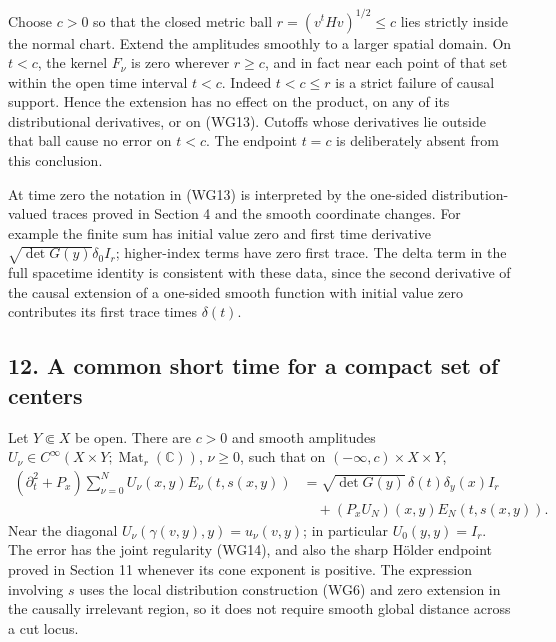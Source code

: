 \documentclass[
  11pt,
]{article}
\begin{document}
Choose \(c>0\) so that the closed metric ball \(r=(v^tHv)^{1/2}\leq c\)
lies strictly inside the normal chart. Extend the amplitudes smoothly to
a larger spatial domain. On \(t<c\), the kernel \(F_\nu\) is zero
wherever \(r\geq c\), and in fact near each point of that set within the
open time interval \(t<c\). Indeed \(t< c\leq r\) is a strict failure of
causal support. Hence the extension has no effect on the product, on any
of its distributional derivatives, or on (WG13). Cutoffs whose
derivatives lie outside that ball cause no error on \(t<c\). The
endpoint \(t=c\) is deliberately absent from this conclusion.

At time zero the notation in (WG13) is interpreted by the one-sided
distribution-valued traces proved in Section 4 and the smooth coordinate
changes. For example the finite sum has initial value zero and first
time derivative \(\sqrt{\det G(y)}\delta_0I_r\); higher-index terms have
zero first trace. The delta term in the full spacetime identity is
consistent with these data, since the second derivative of the causal
extension of a one-sided smooth function with initial value zero
contributes its first trace times \(\delta(t)\).

\subsection{12. A common short time for a compact set of
centers}\label{a-common-short-time-for-a-compact-set-of-centers}

Let \(Y\Subset X\) be open. There are \(c>0\) and smooth amplitudes
\(U_\nu\in C^\infty(X\times Y;\operatorname{Mat}_r(\mathbb C))\),
\(\nu\geq0\), such that on \((-\infty,c)\times X\times Y\), \[
\begin{split}
 (\partial_t^2+P_x)\sum_{\nu=0}^N
           U_\nu(x,y)E_\nu(t,s(x,y))
   &=\sqrt{\det G(y)}\,\delta(t)\delta_y(x)I_r\\
   &\quad +(P_xU_N)(x,y)E_N(t,s(x,y)).
\end{split}
 \tag{WG17}
\] Near the diagonal \(U_\nu(\gamma(v,y),y)=u_\nu(v,y)\); in particular
\(U_0(y,y)=I_r\). The error has the joint regularity (WG14), and also
the sharp Hölder endpoint proved in Section 11 whenever its cone
exponent is positive. The expression involving \(s\) uses the local
distribution construction (WG6) and zero extension in the causally
irrelevant region, so it does not require smooth global distance across
a cut locus.
\end{document}
